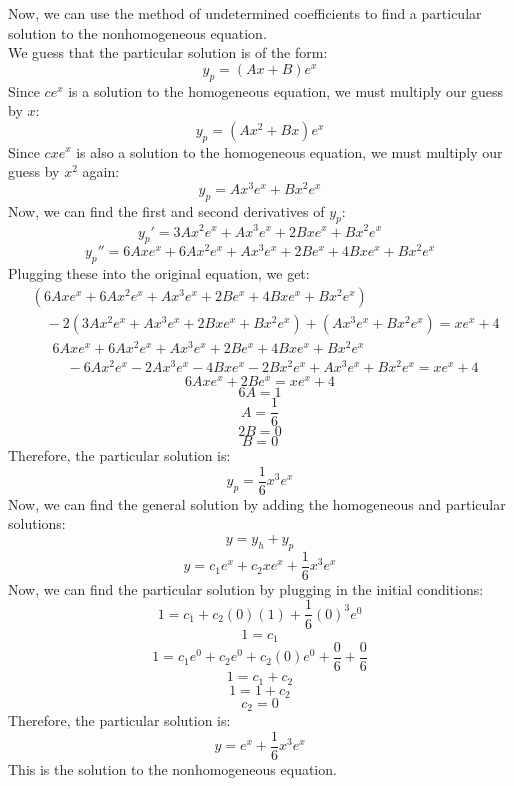 \documentclass{article}
\begin{document}
Now, we can use the method of undetermined coefficients to find a particular solution to the nonhomogeneous equation.
\\We guess that the particular solution is of the form:
\[
y_p = (Ax + B)e^{x}
\]
Since $ce^{x}$ is a solution to the homogeneous equation, we must multiply our guess by $x$:
\[
y_p = (Ax^{2} + Bx)e^{x}
\]
Since $cxe^{x}$ is also a solution to the homogeneous equation, we must multiply our guess by $x^{2}$ again:
\[
y_p = Ax^{3}e^{x} + Bx^{2}e^{x}
\]
Now, we can find the first and second derivatives of $y_p$:
\[
y_p' = 3Ax^{2}e^{x} + Ax^{3}e^{x} + 2Bxe^{x} + Bx^{2}e^{x}
\]
\[
y_p'' = 6Axe^{x} + 6Ax^{2}e^{x} + Ax^{3}e^{x} + 2Be^{x} + 4Bxe^{x} + Bx^{2}e^{x}
\]
Plugging these into the original equation, we get:
\begin{align*}
    & (6Axe^{x} + 6Ax^{2}e^{x} + Ax^{3}e^{x} + 2Be^{x} + 4Bxe^{x} + Bx^{2}e^{x}) \\
    & \quad - 2(3Ax^{2}e^{x} + Ax^{3}e^{x} + 2Bxe^{x} + Bx^{2}e^{x}) + (Ax^{3}e^{x} + Bx^{2}e^{x}) = xe^{x} + 4
\end{align*}
\begin{align*}
    & 6Axe^{x} + 6Ax^{2}e^{x} + Ax^{3}e^{x} + 2Be^{x} + 4Bxe^{x} + Bx^{2}e^{x} \\
    & \quad - 6Ax^{2}e^{x} - 2Ax^{3}e^{x} - 4Bxe^{x} - 2Bx^{2}e^{x} + Ax^{3}e^{x} + Bx^{2}e^{x} = xe^{x} + 4
\end{align*}
\[
    6Axe^{x} + 2Be^{x} = xe^{x} + 4
\]
\[
    6A = 1
\]
\[
    A = \frac{1}{6}
\]
\[
    2B = 0
\]
\[
    B = 0
\]
Therefore, the particular solution is:
\[
y_p = \frac{1}{6}x^{3}e^{x}
\]
Now, we can find the general solution by adding the homogeneous and particular solutions:
\[
y = y_h + y_p
\]
\[
y = c_1e^{x} + c_2xe^{x} + \frac{1}{6}x^{3}e^{x}
\]
Now, we can find the particular solution by plugging in the initial conditions:
\[
1 = c_1 + c_2(0)(1) + \frac{1}{6}(0)^{3}e^{0}
\]
\[
1 = c_1
\]
\[
    1 = c_1e^{0} + c_2e^{0} + c_2(0)e^{0} + \frac{0}{6} + \frac{0}{6}
\]
\[
    1 = c_1 + c_2
\]
\[
    1 = 1 + c_2
\]
\[
    c_2 = 0
\]
Therefore, the particular solution is:
\[
y = e^{x} + \frac{1}{6}x^{3}e^{x}
\]
This is the solution to the nonhomogeneous equation.
\end{document}
